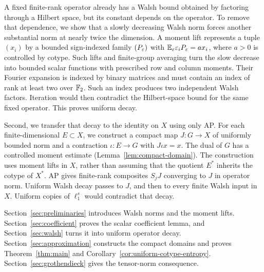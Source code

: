 A fixed finite-rank operator already has a Walsh bound obtained by
factoring through a Hilbert space, but its constant depends on the
operator. To remove that dependence, we show that a slowly decreasing
Walsh norm forces another substantial norm at nearly twice the
dimension. A moment lift represents a tuple \((x_i)\) by a bounded
sign-indexed family \((P_\varepsilon)\) with
\(\mathbb E_\varepsilon\varepsilon_iP_\varepsilon=ax_i\), where \(a>0\) is controlled by cotype.
Such lifts and finite-group averaging turn the slow decrease into
bounded scalar functions with prescribed row and column moments.
Their Fourier expansion is indexed by binary matrices and must contain
an index of rank at least two over \(\mathbb F_2\). Such an index produces
two independent Walsh factors.
Iteration would then contradict the Hilbert-space bound for the same
fixed operator. This proves uniform decay.

Second, we transfer that decay to the identity on \(X\) using only AP.
For each finite-dimensional \(E\subset X\), we construct a compact map
\(J:G\to X\) of uniformly bounded norm and a contraction \(\iota:E\to G\)
with \(J\iota x=x\). The dual of \(G\) has a controlled moment estimate
(Lemma~\ref{lem:compact-domain}). The construction uses moment lifts in
\(X\), rather than assuming that the quotient \(E^*\) inherits the
cotype of \(X^*\). AP gives finite-rank composites \(S_jJ\) converging
to \(J\) in operator norm. Uniform Walsh decay passes to \(J\), and
then to every finite Walsh input in \(X\). Uniform copies of
\(\ell_1^s\) would contradict that decay.

Section~\ref{sec:preliminaries} introduces Walsh norms and the moment lifts.
Section~\ref{sec:coefficient} proves the scalar coefficient lemma, and
Section~\ref{sec:walsh} turns it into uniform operator decay.
Section~\ref{sec:approximation} constructs the compact domains and proves
Theorem~\ref{thm:main} and Corollary~\ref{cor:uniform-cotype-entropy}.
Section~\ref{sec:grothendieck} gives the tensor-norm consequence.
